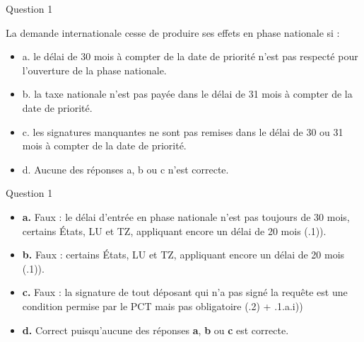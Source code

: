 \begin{frame}{Question 1}

\begin{block}{}
La demande internationale cesse de produire ses effets en phase nationale si :

\begin{itemize}
  \item[$\circ$] a. le délai de 30 mois à compter de la date de priorité n’est pas respecté pour 
  l’ouverture de la phase nationale. 
  \item[$\circ$] b. la taxe nationale n’est pas payée dans le délai de 31 mois à compter de la date de 
  priorité. 
  \item[$\circ$] c. les signatures manquantes ne sont pas remises dans le délai de 30 ou 31 mois à 
  compter de la date de priorité. 
  \item[$\bullet$] d. Aucune des réponses a, b ou c n’est correcte.
\end{itemize}

\end{block}

\end{frame}

\begin{frame}{Question 1}

\begin{itemize}
  \item[$\circ$] \textbf{a.} \; Faux : le délai d’entrée en phase nationale n’est pas toujours
de 30 mois, certains États, LU et TZ, appliquant encore un délai de 20 mois
(.1)).

  \item[$\circ$] \textbf{b.} \; Faux : certains États, LU et TZ, appliquant encore un délai de 20 mois
  (.1)).

  \item[$\circ$] \textbf{c.} \; Faux : la signature de tout
  déposant qui n'a pas signé la requête est une condition
  permise par le PCT mais pas obligatoire
  (.2) + .1.a.i)) 

  \item[$\circ$] \textbf{d.} \; Correct puisqu'aucune des réponses \textbf{a},
  \textbf{b} ou \textbf{c} est correcte.
\end{itemize}

\end{frame}
